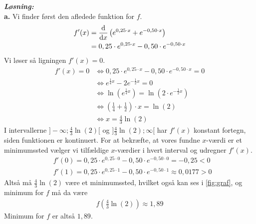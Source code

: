 \documentclass{article}
\newcommand{\sol}{\setlength{\parindent}{0cm}\textbf{\textit{Løsning:}}\setlength{\parindent}{1cm}}
\begin{document}
\sol \\
\textbf{a.}
Vi finder først den afledede funktion for $f$.
\begin{equation*}
\begin{split}
  f'(x)&=\dv{x} \left(e^{0,25 \cdot x}+ e^{-0,50 \cdot x}\right) \\ 
  &=0,25 \cdot e^{0,25 \cdot x}-0,50 \cdot e^{-0,50 \cdot x}
\end{split}
\end{equation*}
Vi løser så ligningen $f'(x)=0$. 
\begin{equation*}
\begin{split}
  f'(x)=0 &\iff 0,25 \cdot e^{0,25 \cdot x}-0,50 \cdot e^{-0,50 \cdot x}=0\\
  &\iff e^{\frac{1}{4}x}-2e^{-\frac{1}{2}x}=0\\ 
  &\iff \ln \left(e^{\frac{1}{4}x}\right) = \ln \left(2 \cdot e^{-\frac{1}{2}x}\right) \\
  &\iff \left(\frac{1}{4}+\frac{1}{2}\right) \cdot x=\ln(2) \\
  &\iff x=\frac{4}{3}\ln(2)
\end{split}
\end{equation*}
I intervallerne $]-\infty;\frac{4}{3}\ln(2)[$ og $]\frac{4}{3}\ln(2);\infty[$ har $f'(x)$ konstant fortegn, siden funktionen er kontinuert. 
For at bekræfte, at vores fundne $x$-værdi er et minimumssted vælger vi tilfældige $x$-værdier i hvert interval og udregner $f'(x)$. 
\begin{equation*}
\begin{split}
  &f'(0)=0,25 \cdot e^{0,25 \cdot 0}-0,50 \cdot e^{-0,50 \cdot 0}=-0,25<0\\
  &f'(1)=0,25 \cdot e^{0,25 \cdot 1}-0,50 \cdot e^{-0,50 \cdot 1}\approx 0,0177>0
\end{split}
\end{equation*}
Altså må $\frac{4}{3}\ln(2)$ være et minimumssted, hvilket også kan ses i \cref{fig:graf}, og minimum for $f$ må da være
\begin{equation*}
\begin{split}
  f\left(\frac{4}{3}\ln(2)\right) \approx 1,89
\end{split}
\end{equation*}
Minimum for $f$ er altså $1,89$.
\end{document}
